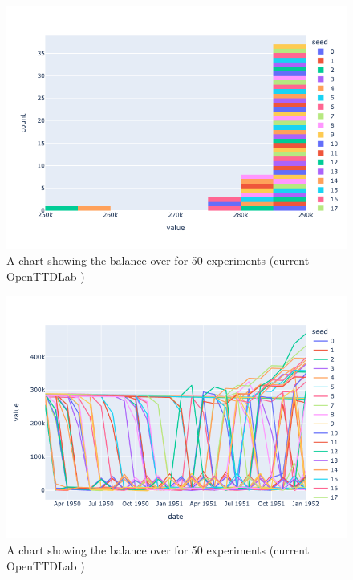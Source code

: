 \documentclass[logo,msc,dsti]{infthesis}    %
\begin{document}
\begin{figure}[h]
\centering
\includegraphics[width=\columnwidth]{assets/end-of-first-year-distribution.png}
\caption{A chart showing the balance over for 50 experiments (current OpenTTDLab )}
\label{fig:first-year}
\end{figure}

\begin{figure}[h]
\centering
\includegraphics[width=\columnwidth]{assets/first-2-years.png}
\caption{A chart showing the balance over for 50 experiments (current OpenTTDLab )}
\label{fig:first-year}
\end{figure}
\end{document}
